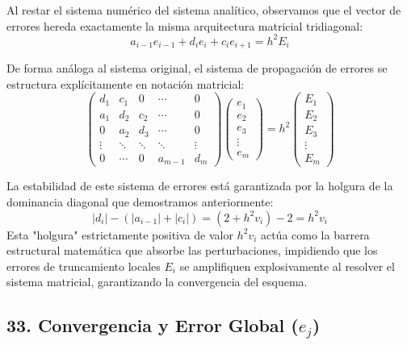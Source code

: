 \documentclass[12pt]{article}
\begin{document}
Al restar el sistema numérico del sistema analítico, observamos que el vector de errores hereda exactamente la misma arquitectura matricial tridiagonal:
\begin{equation}
    a_{i-1} e_{i-1} + d_i e_i + c_i e_{i+1} = h^2 E_i
\end{equation}

De forma análoga al sistema original, el sistema de propagación de errores se estructura explícitamente en notación matricial:
\begin{equation}
\begin{pmatrix}
    d_1 & c_1 & 0 & \cdots & 0 \\
    a_1 & d_2 & c_2 & \cdots & 0 \\
    0 & a_2 & d_3 & \cdots & 0 \\
    \vdots & \ddots & \ddots & \ddots & \vdots \\
    0 & \cdots & 0 & a_{m-1} & d_m
\end{pmatrix}
\begin{pmatrix}
    e_1 \\
    e_2 \\
    e_3 \\
    \vdots \\
    e_m
\end{pmatrix}
= h^2
\begin{pmatrix}
    E_1 \\
    E_2 \\
    E_3 \\
    \vdots \\
    E_m
\end{pmatrix}
\end{equation}

La estabilidad de este sistema de errores está garantizada por la holgura de la dominancia diagonal que demostramos anteriormente:
\begin{equation}
    |d_i| - (|a_{i-1}| + |c_i|) = (2 + h^2 v_i) - 2 = h^2 v_i
\end{equation}
Esta "holgura" estrictamente positiva de valor $h^2 v_i$ actúa como la barrera estructural matemática que absorbe las perturbaciones, impidiendo que los errores de truncamiento locales $E_i$ se amplifiquen explosivamente al resolver el sistema matricial, garantizando la convergencia del esquema.

\vspace{0.5cm}

\subsection*{33. Convergencia y Error Global ($e_j$)}
\end{document}
